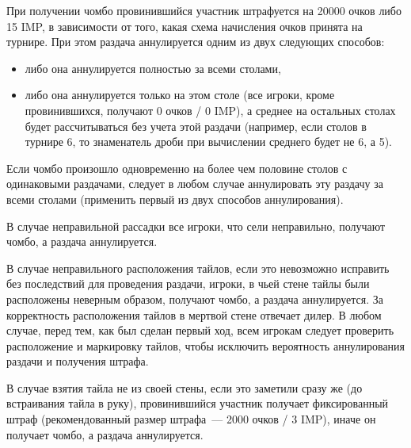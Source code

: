 \begin{additional}
При получении чомбо провинившийся участник штрафуется на 20000 очков либо 15 IMP, в зависимости от того, какая схема начисления очков принята на турнире. При этом раздача аннулируется одним из двух следующих способов:

\begin{itemize}
	\item либо она аннулируется полностью за всеми столами,
	\item либо она аннулируется только на этом столе (все игроки, кроме провинившихся, получают 0 очков / 0 IMP), а среднее на остальных столах будет рассчитываться без учета этой раздачи (например, если столов в турнире 6, то знаменатель дроби при вычислении среднего будет не 6, а 5).
\end{itemize}

\vspace{0.3cm}

Если чомбо произошло одновременно на более чем половине столов с одинаковыми раздачами, следует в любом случае аннулировать эту раздачу за всеми столами (применить первый из двух способов аннулирования).

\vspace{0.3cm}

В случае неправильной рассадки все игроки, что сели неправильно, получают чомбо, а раздача аннулируется.

\vspace{0.3cm}

В случае неправильного расположения тайлов, если это невозможно исправить без последствий для проведения раздачи, игроки, в чьей стене тайлы были расположены неверным образом, получают чомбо, а раздача аннулируется. За корректность расположения тайлов в мертвой стене отвечает дилер. В любом случае, перед тем, как был сделан первый ход, всем игрокам следует проверить расположение и маркировку тайлов, чтобы исключить вероятность аннулирования раздачи и получения штрафа.

\vspace{0.3cm}

В случае взятия тайла не из своей стены, если это заметили сразу же (до встраивания тайла в руку), провинившийся участник получает фиксированный штраф (рекомендованный размер штрафа~--- 2000 очков / 3 IMP), иначе он получает чомбо, а раздача аннулируется.

\end{additional}
